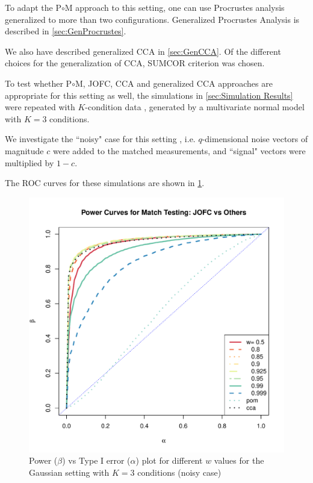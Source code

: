 \documentclass[12pt,oneside,final]{thesis}
\begin{document}
To adapt the P$\circ$M approach to this setting, one can use Procrustes analysis  generalized to more than two configurations. Generalized Procrustes Analysis \cite{GPCA} is described in \autoref{sec:GenProcrustes}.

We also have described generalized CCA in \autoref{sec:GenCCA}.  Of the different choices for the generalization of CCA, SUMCOR criterion was chosen.

To test whether P$\circ$M, JOFC, CCA and generalized CCA approaches are appropriate for this setting as well,
the simulations in \autoref{sec:Simulation Results} were repeated with $K$-condition data , generated by a multivariate normal model with $K=3$ conditions. 
 
 We investigate the  ``noisy" case for this setting , i.e. 
 $q$-dimensional noise vectors of magnitude $c$ were added to the matched measurements, and ``signal" vectors were multiplied by $1-c$.  
 
 The ROC curves for these simulations are shown in \ref{fig:MVN-c001-power-w-Kcond}.


\begin{figure}
\includegraphics[scale=0.95]{MVN-FC-Tradeoff-OOS-3cond.pdf}
\caption{Power ($\beta$) vs Type I error ($\alpha$) plot for different $w$ values for the Gaussian setting with $K=3$ conditions (noisy case)}
\label{fig:MVN-c001-power-w-Kcond}
\end{figure}
\end{document}
